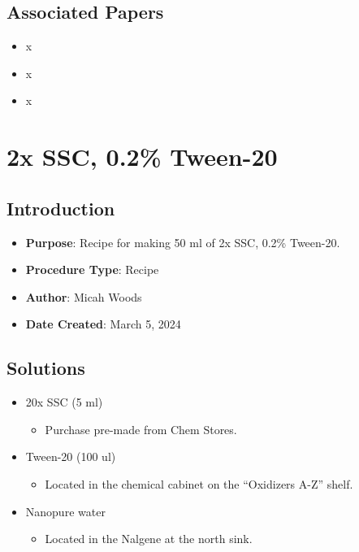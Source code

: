 \documentclass[
  letterpaper,
  DIV=11,
  numbers=noendperiod]{scrreprt}
\providecommand{\tightlist}{%
  \setlength{\itemsep}{0pt}\setlength{\parskip}{0pt}}\usepackage{longtable,booktabs,array}
\begin{document}
\hypertarget{associated-papers-72}{%
\section{Associated Papers}\label{associated-papers-72}}

\begin{itemize}
\tightlist
\item
  x
\item
  x
\item
  x
\end{itemize}

\hypertarget{sec-recipe-tween20}{%
\chapter{2x SSC, 0.2\% Tween-20}\label{sec-recipe-tween20}}

\hypertarget{introduction-104}{%
\section{Introduction}\label{introduction-104}}

\begin{itemize}
\tightlist
\item
  \textbf{Purpose}: Recipe for making 50 ml of 2x SSC, 0.2\% Tween-20.
\item
  \textbf{Procedure Type}: Recipe
\item
  \textbf{Author}: Micah Woods
\item
  \textbf{Date Created}: March 5, 2024
\end{itemize}

\hypertarget{solutions-90}{%
\section{Solutions}\label{solutions-90}}

\begin{itemize}
\tightlist
\item
  20x SSC (5 ml)

  \begin{itemize}
  \tightlist
  \item
    Purchase pre-made from Chem Stores.
  \end{itemize}
\item
  Tween-20 (100 ul)

  \begin{itemize}
  \tightlist
  \item
    Located in the chemical cabinet on the ``Oxidizers A-Z'' shelf.
  \end{itemize}
\item
  Nanopure water

  \begin{itemize}
  \tightlist
  \item
    Located in the Nalgene at the north sink.
  \end{itemize}
\end{itemize}
\end{document}
